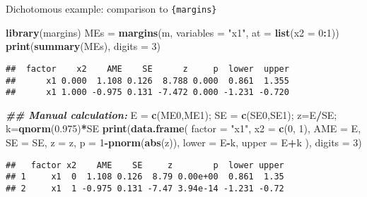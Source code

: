 \documentclass[
  ignorenonframetext,
]{beamer}
\newenvironment{Shaded}{\begin{snugshade}}{\end{snugshade}}
\newcommand{\AttributeTok}[1]{\textcolor[rgb]{0.13,0.29,0.53}{#1}}
\newcommand{\DecValTok}[1]{\textcolor[rgb]{0.00,0.00,0.81}{#1}}
\newcommand{\DocumentationTok}[1]{\textcolor[rgb]{0.56,0.35,0.01}{\textbf{\textit{#1}}}}
\newcommand{\FloatTok}[1]{\textcolor[rgb]{0.00,0.00,0.81}{#1}}
\newcommand{\FunctionTok}[1]{\textcolor[rgb]{0.13,0.29,0.53}{\textbf{#1}}}
\newcommand{\NormalTok}[1]{#1}
\newcommand{\OtherTok}[1]{\textcolor[rgb]{0.56,0.35,0.01}{#1}}
\newcommand{\SpecialCharTok}[1]{\textcolor[rgb]{0.81,0.36,0.00}{\textbf{#1}}}
\newcommand{\StringTok}[1]{\textcolor[rgb]{0.31,0.60,0.02}{#1}}
\begin{document}
\begin{frame}[fragile]{Dichotomous example: comparison to \texttt{\{margins\}}}
\label{dichotomous-example-comparison-to-margins}
\begin{Shaded}
\begin{Highlighting}[]
\FunctionTok{library}\NormalTok{(margins)}
\NormalTok{MEs }\OtherTok{=} \FunctionTok{margins}\NormalTok{(m, }\AttributeTok{variables =} \StringTok{"x1"}\NormalTok{, }\AttributeTok{at =} \FunctionTok{list}\NormalTok{(}\AttributeTok{x2 =} \DecValTok{0}\SpecialCharTok{:}\DecValTok{1}\NormalTok{))}
\FunctionTok{print}\NormalTok{(}\FunctionTok{summary}\NormalTok{(MEs), }\AttributeTok{digits =} \DecValTok{3}\NormalTok{)}
\end{Highlighting}
\end{Shaded}

\begin{verbatim}
##  factor    x2    AME    SE      z     p  lower  upper
##      x1 0.000  1.108 0.126  8.788 0.000  0.861  1.355
##      x1 1.000 -0.975 0.131 -7.472 0.000 -1.231 -0.720
\end{verbatim}

\begin{Shaded}
\begin{Highlighting}[]
\DocumentationTok{\#\# Manual calculation:}
\NormalTok{E }\OtherTok{=} \FunctionTok{c}\NormalTok{(ME0,ME1); SE }\OtherTok{=} \FunctionTok{c}\NormalTok{(SE0,SE1); z}\OtherTok{=}\NormalTok{E}\SpecialCharTok{/}\NormalTok{SE; k}\OtherTok{=}\FunctionTok{qnorm}\NormalTok{(}\FloatTok{0.975}\NormalTok{)}\SpecialCharTok{*}\NormalTok{SE}
\FunctionTok{print}\NormalTok{(}\FunctionTok{data.frame}\NormalTok{(}
    \AttributeTok{factor =} \StringTok{"x1"}\NormalTok{, }\AttributeTok{x2 =} \FunctionTok{c}\NormalTok{(}\DecValTok{0}\NormalTok{, }\DecValTok{1}\NormalTok{), }\AttributeTok{AME =}\NormalTok{ E, }\AttributeTok{SE =}\NormalTok{ SE,}
    \AttributeTok{z =}\NormalTok{ z, }\AttributeTok{p =} \DecValTok{1}\SpecialCharTok{{-}}\FunctionTok{pnorm}\NormalTok{(}\FunctionTok{abs}\NormalTok{(z)), }\AttributeTok{lower =}\NormalTok{ E}\SpecialCharTok{{-}}\NormalTok{k, }\AttributeTok{upper =}\NormalTok{ E}\SpecialCharTok{+}\NormalTok{k}
\NormalTok{), }\AttributeTok{digits =} \DecValTok{3}\NormalTok{)}
\end{Highlighting}
\end{Shaded}

\begin{verbatim}
##   factor x2    AME    SE     z        p  lower upper
## 1     x1  0  1.108 0.126  8.79 0.00e+00  0.861  1.35
## 2     x1  1 -0.975 0.131 -7.47 3.94e-14 -1.231 -0.72
\end{verbatim}
\end{frame}
\end{document}

